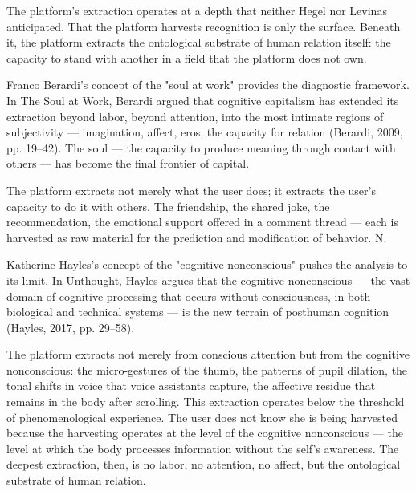 The platform's extraction operates at a depth that neither Hegel nor Levinas anticipated. That the platform harvests recognition is only the surface. Beneath it, the platform extracts the ontological substrate of human relation itself: the capacity to stand with another in a field that the platform does not own.

Franco Berardi's concept of the "soul at work" provides the diagnostic framework. In The Soul at Work, Berardi argued that cognitive capitalism has extended its extraction beyond labor, beyond attention, into the most intimate regions of subjectivity — imagination, affect, eros, the capacity for relation (Berardi, 2009, pp. 19–42). The soul — the capacity to produce meaning through contact with others — has become the final frontier of capital.

The platform extracts not merely what the user does; it extracts the user's capacity to do it with others. The friendship, the shared joke, the recommendation, the emotional support offered in a comment thread — each is harvested as raw material for the prediction and modification of behavior. N.

Katherine Hayles's concept of the "cognitive nonconscious" pushes the analysis to its limit. In Unthought, Hayles argues that the cognitive nonconscious — the vast domain of cognitive processing that occurs without consciousness, in both biological and technical systems — is the new terrain of posthuman cognition (Hayles, 2017, pp. 29–58).

The platform extracts not merely from conscious attention but from the cognitive nonconscious: the micro-gestures of the thumb, the patterns of pupil dilation, the tonal shifts in voice that voice assistants capture, the affective residue that remains in the body after scrolling. This extraction operates below the threshold of phenomenological experience. The user does not know she is being harvested because the harvesting operates at the level of the cognitive nonconscious — the level at which the body processes information without the self's awareness. The deepest extraction, then, is no labor, no attention, no affect, but the ontological substrate of human relation.

